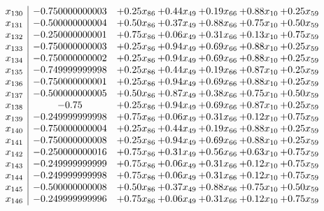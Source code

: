 \documentclass[8pt]{article}
\begin{document}
\[\begin{array}{c| c c@{\hskip 2pt} c@{\hskip 2pt} c@{\hskip 2pt} c@{\hskip 2pt} c@{\hskip 2pt} }
 x_{130}   &  -0.750000000003 & +  0.25 x_{86} & +  0.44 x_{49} & +  0.19 x_{66} & +  0.88 x_{10} & +  0.25 x_{59}\\
 x_{131}   &  -0.500000000004 & +  0.50 x_{86} & +  0.37 x_{49} & +  0.88 x_{66} & +  0.75 x_{10} & +  0.50 x_{59}\\
 x_{132}   &  -0.250000000001 & +  0.75 x_{86} & +  0.06 x_{49} & +  0.31 x_{66} & +  0.13 x_{10} & +  0.75 x_{59}\\
 x_{133}   &  -0.750000000003 & +  0.25 x_{86} & +  0.94 x_{49} & +  0.69 x_{66} & +  0.88 x_{10} & +  0.25 x_{59}\\
 x_{134}   &  -0.750000000002 & +  0.25 x_{86} & +  0.94 x_{49} & +  0.69 x_{66} & +  0.88 x_{10} & +  0.25 x_{59}\\
 x_{135}   &  -0.749999999998 & +  0.25 x_{86} & +  0.44 x_{49} & +  0.19 x_{66} & +  0.87 x_{10} & +  0.25 x_{59}\\
 x_{136}   &  -0.750000000001 & +  0.25 x_{86} & +  0.94 x_{49} & +  0.69 x_{66} & +  0.88 x_{10} & +  0.25 x_{59}\\
 x_{137}   &  -0.500000000005 & +  0.50 x_{86} & +  0.87 x_{49} & +  0.38 x_{66} & +  0.75 x_{10} & +  0.50 x_{59}\\
 x_{138}   &  -0.75 & +  0.25 x_{86} & +  0.94 x_{49} & +  0.69 x_{66} & +  0.87 x_{10} & +  0.25 x_{59}\\
 x_{139}   &  -0.249999999998 & +  0.75 x_{86} & +  0.06 x_{49} & +  0.31 x_{66} & +  0.12 x_{10} & +  0.75 x_{59}\\
 x_{140}   &  -0.750000000004 & +  0.25 x_{86} & +  0.44 x_{49} & +  0.19 x_{66} & +  0.88 x_{10} & +  0.25 x_{59}\\
 x_{141}   &  -0.750000000008 & +  0.25 x_{86} & +  0.94 x_{49} & +  0.69 x_{66} & +  0.88 x_{10} & +  0.25 x_{59}\\
 x_{142}   &  -0.250000000016 & +  0.75 x_{86} & +  0.31 x_{49} & +  0.56 x_{66} & +  0.63 x_{10} & +  0.75 x_{59}\\
 x_{143}   &  -0.249999999999 & +  0.75 x_{86} & +  0.06 x_{49} & +  0.31 x_{66} & +  0.12 x_{10} & +  0.75 x_{59}\\
 x_{144}   &  -0.249999999998 & +  0.75 x_{86} & +  0.06 x_{49} & +  0.31 x_{66} & +  0.12 x_{10} & +  0.75 x_{59}\\
 x_{145}   &  -0.500000000008 & +  0.50 x_{86} & +  0.37 x_{49} & +  0.88 x_{66} & +  0.75 x_{10} & +  0.50 x_{59}\\
 x_{146}   &  -0.249999999996 & +  0.75 x_{86} & +  0.06 x_{49} & +  0.31 x_{66} & +  0.12 x_{10} & +  0.75 x_{59}\\

\end{array}\]
\end{document}
